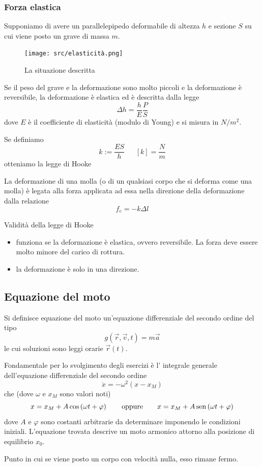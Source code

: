 \documentclass{article}
\theoremstyle{plain}
\begin{document}
\subsubsection{Forza elastica}
Supponiamo di avere un parallelepipedo deformabile di altezza $h$ e sezione $S$ su cui viene posto un grave di massa $m$.

\begin{figure}[h]
    \centering
    \texttt{[image: src/elasticità.png]}
    \caption{La situazione descritta}
\end{figure}

Se il peso del grave e la deformazione sono molto piccoli e la deformazione è reversibile, la deformazione è elastica ed è descritta dalla legge
\[\Delta h=\frac{h}{E}\frac{P}{S}\]
dove $E$ è il coefficiente di elasticità (modulo di Young) e si misura in $N/m^2$.

Se definiamo 
\[k:=\frac{ES}{h}~~~~~~~[k]=\frac{N}{m}\]
otteniamo la legge di Hooke
\begin{shaded}
    \begin{law}[Hooke]
        La deformazione di una molla (o di un qualsiasi corpo che si deforma come una molla) è legata alla forza applicata ad essa nella direzione della deformazione dalla relazione
        \[f_e=-k\Delta l\]
    \end{law}
\end{shaded}
Validità della legge di Hooke
\begin{itemize}
    \item funziona se la deformazione è elastica, ovvero reversibile. La forza deve essere molto minore del carico di rottura.
    \item la deformazione è solo in una direzione.
\end{itemize}
\subsection{Equazione del moto}
Si definisce equazione del moto un'equazione differenziale del secondo ordine del tipo
\[g(\vec r, \vec v, t)=m\vec a\]
le cui soluzioni sono leggi orarie $\vec{r}(t)$.

Fondamentale per lo svolgimento degli esercizi è l' integrale generale dell'equazione differenziale del secondo ordine
\[\ddot x = -\omega^2 (x - x_M)\]
che (dove $\omega$ e $x_M$ sono valori noti)
\[x = x_M + A\cos \left( \omega t + \varphi \right)\qquad \text{oppure}\qquad x = x_M + A\operatorname{sen} \left( \omega t + \varphi \right)\]
dove $A$ e $\varphi$ sono costanti arbitrarie da determinare imponendo le condizioni iniziali. L'equazione trovata descrive un moto armonico attorno alla posizione di equilibrio $x_0$.
\begin{boxdef}
    Punto in cui se viene posto un corpo con velocità nulla, esso rimane fermo.
\end{boxdef}
\end{document}
